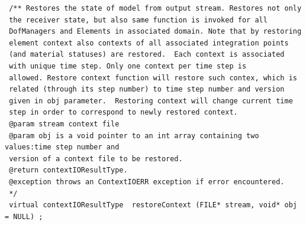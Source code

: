 \documentclass[a4paper]{article}
\begin{document}
{\begin{verbatim}
 /** Restores the state of model from output stream. Restores not only
 the receiver state, but also same function is invoked for all
 DofManagers and Elements in associated domain. Note that by restoring
 element context also contexts of all associated integration points
 (and material statuses) are restored.  Each context is associated
 with unique time step. Only one context per time step is
 allowed. Restore context function will restore such contex, which is
 related (through its step number) to time step number and version
 given in obj parameter.  Restoring context will change current time
 step in order to correspond to newly restored context.
 @param stream context file
 @param obj is a void pointer to an int array containing two values:time step number and 
 version of a context file to be restored.
 @return contextIOResultType.
 @exception throws an ContextIOERR exception if error encountered.
 */
 virtual contextIOResultType  restoreContext (FILE* stream, void* obj = NULL) ;


\end{verbatim}}
\end{document}
